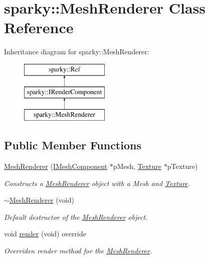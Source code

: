\hypertarget{classsparky_1_1_mesh_renderer}{}\section{sparky\+:\+:Mesh\+Renderer Class Reference}
\label{classsparky_1_1_mesh_renderer}
Inheritance diagram for sparky\+:\+:Mesh\+Renderer\+:\begin{figure}[H]
\begin{center}
\leavevmode
\includegraphics[height=3.000000cm]{classsparky_1_1_mesh_renderer}
\end{center}
\end{figure}
\subsection*{Public Member Functions}
\begin{DoxyCompactItemize}
\item 
\hyperlink{classsparky_1_1_mesh_renderer_ada0660bb1d7a7d59ece4e0d071d9cbe4}{Mesh\+Renderer} (\hyperlink{classsparky_1_1_i_mesh_component}{I\+Mesh\+Component} $\ast$p\+Mesh, \hyperlink{classsparky_1_1_texture}{Texture} $\ast$p\+Texture)
\begin{DoxyCompactList}\small\item\em Constructs a \hyperlink{classsparky_1_1_mesh_renderer}{Mesh\+Renderer} object with a Mesh and \hyperlink{classsparky_1_1_texture}{Texture}. \end{DoxyCompactList}\item 
\hyperlink{classsparky_1_1_mesh_renderer_a3077441957a3afa838f554dee6f312bc}{$\sim$\+Mesh\+Renderer} (void)
\begin{DoxyCompactList}\small\item\em Default destructor of the \hyperlink{classsparky_1_1_mesh_renderer}{Mesh\+Renderer} object. \end{DoxyCompactList}\item 
void \hyperlink{classsparky_1_1_mesh_renderer_a1a853da3e75510c27645f39aabe37edf}{render} (void) override
\begin{DoxyCompactList}\small\item\em Overriden render method for the \hyperlink{classsparky_1_1_mesh_renderer}{Mesh\+Renderer}. \end{DoxyCompactList}\end{DoxyCompactItemize}
